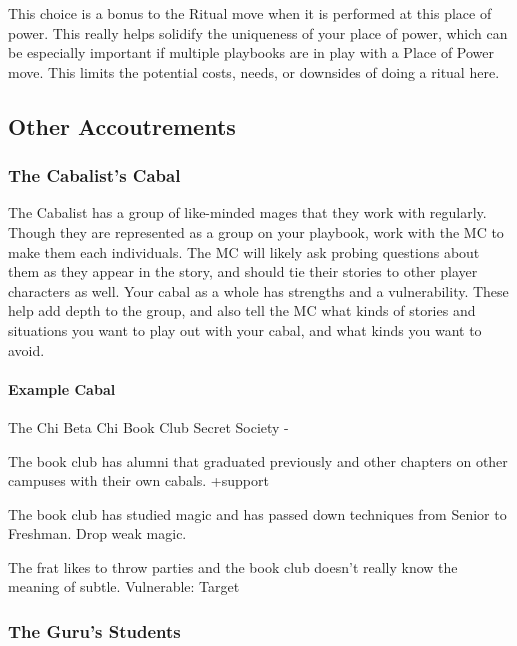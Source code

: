 \documentclass[10pt,twoside,openright]{memoir}
\begin{document}
This choice is a bonus to the Ritual move when it is performed at this
place of power. This really helps solidify the uniqueness of your place
of power, which can be especially important if multiple playbooks are in
play with a Place of Power move. This limits the potential costs, needs,
or downsides of doing a ritual here.

\hypertarget{other-accoutrements}{%
\subsection{Other Accoutrements}\label{other-accoutrements}}

\hypertarget{the-cabalists-cabal}{%
\subsubsection{The Cabalist's Cabal}\label{the-cabalists-cabal}}

The Cabalist has a group of like-minded mages that they work with
regularly. Though they are represented as a group on your playbook, work
with the MC to make them each individuals. The MC will likely ask
probing questions about them as they appear in the story, and should tie
their stories to other player characters as well. Your cabal as a whole
has strengths and a vulnerability. These help add depth to the group,
and also tell the MC what kinds of stories and situations you want to
play out with your cabal, and what kinds you want to avoid.

\hypertarget{example-cabal}{%
\paragraph{Example Cabal}\label{example-cabal}}

The Chi Beta Chi Book Club Secret Society -

The book club has alumni that graduated previously and other chapters on
other campuses with their own cabals. +support

The book club has studied magic and has passed down techniques from
Senior to Freshman. Drop weak magic.

The frat likes to throw parties and the book club doesn't really know
the meaning of subtle. Vulnerable: Target

\hypertarget{the-gurus-students}{%
\subsubsection{The Guru's Students}\label{the-gurus-students}}
\end{document}
